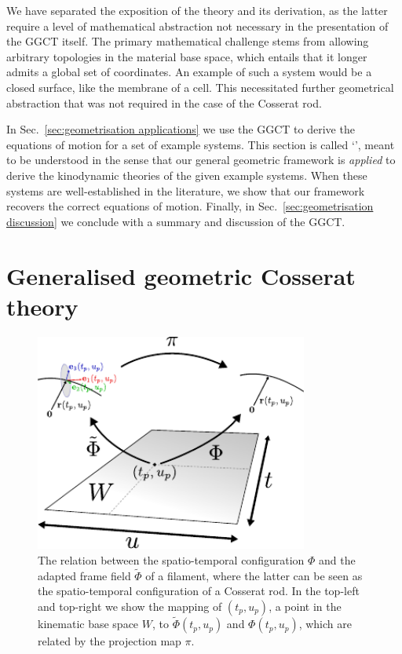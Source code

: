 We have separated the exposition of the theory and its derivation, as the latter require a level of mathematical abstraction not necessary in the presentation of the GGCT itself. The primary mathematical challenge stems from allowing arbitrary topologies in the material base space, which entails that it longer admits a global set of coordinates. An example of such a system would be a closed surface, like the membrane of a cell. This necessitated further geometrical abstraction that was not required in the case of the Cosserat rod. 

In Sec.~\ref{sec:geometrisation applications} we use the GGCT to derive the equations of motion for a set of example systems. This section is called `', meant to be understood in the sense that our general geometric framework is \emph{applied} to derive the kinodynamic theories of the given example systems. When these systems are well-established in the literature, we show that our framework recovers the correct equations of motion. Finally, in Sec.~\ref{sec:geometrisation discussion} we conclude with a summary and discussion of the GGCT.

\section{Generalised geometric Cosserat theory} \label{sec:The GGCT}

\begin{figure}[t]
\centering
        \includegraphics[width=0.8\textwidth]{figs_part2/ch8_geometrisation/cosserat_geometrisation.pdf}
        \caption{The relation between the spatio-temporal configuration $\Phi$ and the adapted frame field $\tilde{\Phi}$ of a filament, where the latter can be seen as the spatio-temporal configuration of a Cosserat rod. In the top-left and top-right we show the mapping of $(t_p, u_p)$, a point in the kinematic base space $W$, to $\tilde{\Phi}(t_p, u_p)$ and $\Phi(t_p, u_p)$, which are related by the projection map $\pi$.}\label{fig:cosserat rod geometrisation illustration}
\end{figure}

